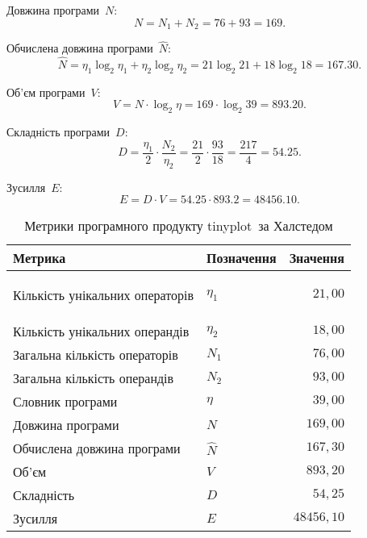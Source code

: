 \documentclass[a4paper,oneside,DIV=12,12pt]{scrartcl}
\newcommand{\progname}{tinyplot}
\begin{document}
		Довжина програми~$N$:
		\[
			N = N_1 + N_2 = 76 + 93 = 169.
		\]
		
		Обчислена довжина програми~$\hat{N}$:
		\[
			\hat{N} = \eta_1 \log_2 \eta_1 + \eta_2 \log_2 \eta_2
			        = 21 \log_2 21 + 18 \log_2 18
					= \num{167,30}.
		\]
		
		Об'єм програми~$V$:
		\[
			V = N \cdot \log_2 \eta
			  = 169 \cdot \log_2 39
			  = \num{893,20}.
		\]
		
		Складність програми~$D$:
		\[
			D = \frac{\eta_1}{2} \cdot \frac{N_2}{\eta_2}
			  = \frac{21}{2} \cdot \frac{93}{18}
			  = \frac{217}{4}
			  = \num{54,25}.
		\]
		
		Зусилля~$E$:
		\[
			E = D \cdot V
			  = \num{54,25} \cdot \num{893,2}
			  = \num{48456,10}.
		\]
		
		\begin{longtable}[c]{llr}
				\toprule
					Метрика & Позначення & Значення\\
				\midrule
				\endhead
				\bottomrule
				\caption{Метрики програмного продукту \progname\ за Халстедом}
				\endfoot
				\label{tab:software-metrics-halstead}
				
					Кількість унікальних операторів & $\eta_1$  & $21{,}00$\\
					Кількість унікальних операндів  & $\eta_2$  & $18{,}00$\\
					Загальна кількість операторів   & $N_1$     & $76{,}00$\\
					Загальна кількість операндів    & $N_2$     & $93{,}00$\\
					Словник програми                & $\eta$    & $39{,}00$\\
					Довжина програми                & $N$       & $169{,}00$\\
					Обчислена довжина програми      & $\hat{N}$ & $167{,}30$ \\
					Об'єм                           & $V$       & $893{,}20$ \\
					Складність                      & $D$       & $54{,}25$ \\
					Зусилля                         & $E$       & $48456{,}10$ \\
		\end{longtable}
		
\end{document}
